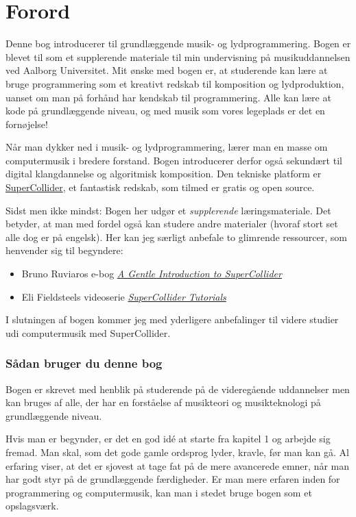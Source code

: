 \chapter{Forord}
Denne bog introducerer til grundlæggende musik- og lydprogrammering. Bogen er blevet til som et supplerende materiale til min undervisning på musikuddannelsen ved Aalborg Universitet. Mit ønske med bogen er, at studerende kan lære at bruge programmering som et kreativt redskab til komposition og lydproduktion, uanset om man på forhånd har kendskab til programmering. Alle kan lære at kode på grundlæggende niveau, og med musik som vores legeplads er det en fornøjelse!

Når man dykker ned i musik- og lydprogrammering, lærer man en masse om computermusik i bredere forstand. Bogen introducerer derfor også sekundært til digital klangdannelse og algoritmisk komposition. Den tekniske platform er \href{https://supercollider.github.io}{SuperCollider}, et fantastisk redskab, som tilmed er gratis og open source.

Sidst men ikke mindst: Bogen her udgør et \textit{supplerende} læringsmateriale. Det betyder, at man med fordel også kan studere andre materialer (hvoraf stort set alle dog er på engelsk). Her kan jeg særligt anbefale to glimrende ressourcer, som henvender sig til begyndere:

\begin{itemize}
\item Bruno Ruviaros e-bog \textit{\href{https://ccrma.stanford.edu/~ruviaro/texts/A\_Gentle\_Introduction\_To\_SuperCollider.pdf}{A Gentle Introduction to SuperCollider}}
\item Eli Fieldsteels videoserie \textit{\href{https://www.youtube.com/playlist?list=PLPYzvS8A\_rTaNDweXe6PX4CXSGq4iEWYC}{SuperCollider Tutorials}} 
\end{itemize}

I slutningen af bogen kommer jeg med yderligere anbefalinger til videre studier udi computermusik med SuperCollider.

\subsection{Sådan bruger du denne bog}

Bogen er skrevet med henblik på studerende på de videregående uddannelser men kan bruges af alle, der har en forståelse af musikteori og musikteknologi på grundlæggende niveau.

Hvis man er begynder, er det en god idé at starte fra kapitel 1 og arbejde sig fremad. Man skal, som det gode gamle ordsprog lyder, kravle, før man kan gå. Al erfaring viser, at det er sjovest at tage fat på de mere avancerede emner, når man har godt styr på de grundlæggende færdigheder. Er man mere erfaren inden for programmering og computermusik, kan man i stedet bruge bogen som et opslagsværk.

